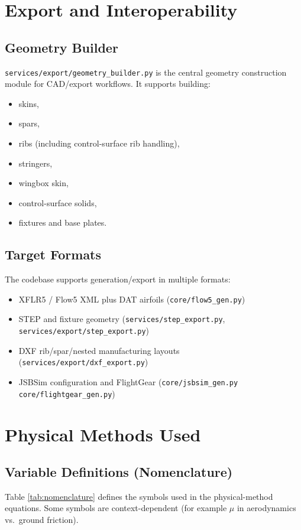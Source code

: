 ﻿\documentclass[11pt]{article}
\begin{document}
\section{Export and Interoperability}
\subsection{Geometry Builder}
\texttt{services/export/geometry\_builder.py} is the central geometry construction module for CAD/export workflows. It supports building:
\begin{itemize}
\item skins,
\item spars,
\item ribs (including control-surface rib handling),
\item stringers,
\item wingbox skin,
\item control-surface solids,
\item fixtures and base plates.
\end{itemize}

\subsection{Target Formats}
The codebase supports generation/export in multiple formats:
\begin{itemize}
\item XFLR5 / Flow5 XML plus DAT airfoils (\texttt{core/flow5\_gen.py})
\item STEP and fixture geometry (\texttt{services/step\_export.py}, \texttt{services/export/step\_export.py})
\item DXF rib/spar/nested manufacturing layouts (\texttt{services/export/dxf\_export.py})
\item JSBSim configuration and FlightGear (\texttt{core/jsbsim\_gen.py} \texttt{core/flightgear\_gen.py})

\end{itemize}

\section{Physical Methods Used}

\subsection{Variable Definitions (Nomenclature)}
Table \ref{tab:nomenclature} defines the symbols used in the physical-method equations.
Some symbols are context-dependent (for example \(\mu\) in aerodynamics vs.\ ground friction).
\end{document}
